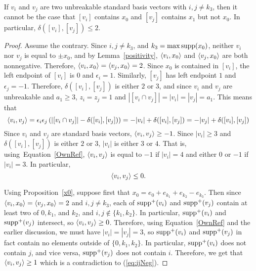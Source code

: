 
\begin{lemma}\label{excludedintervals}
If $v_i$ and $v_j$ are two unbreakable standard basis vectors with $i,j \neq k_3$, then it cannot be the case that $[v_i]$ contains $x_0$ and $[v_j]$ contains $x_1$ but not $x_0$. In particular, $\delta([v_i],[v_j]) \le 2$.
\end{lemma}
\begin{proof}
Assume the contrary. Since $i,j \neq k_3$, and $k_3 = \max \operatorname{supp}(x_0)$, neither $v_i$ nor $v_j$ is equal to $\pm x_0$, and by Lemma~\ref{positivity}, $\left\langle v_i , x_0 \right\rangle$ and $\left\langle v_j , x_0 \right\rangle$ are both nonnegative. Therefore, $\left\langle v_i , x_0 \right\rangle = \left\langle v_j , x_0 \right\rangle = 2$. Since $x_0$ is contained in $[v_i]$, the left endpoint of $[v_i]$ is $0$ and $\epsilon_i = 1$. Similarly, $[v_j]$ has left endpoint $1$ and $\epsilon_j = -1$. Therefore, $\delta([v_i], [v_j])$ is either $2$ or $3$, and since $v_i$ and $v_j$ are unbreakable and $a_1\ge3$, $z_i=z_j=1$ and $|[v_i \cap v_j]| = |v_i| = |v_j|=a_1$. This means that
\begin{equation}\label{OwnRef}
\left\langle v_i , v_j \right\rangle = \epsilon_i \epsilon_j \left(|[v_i \cap v_j]| - \delta([v_i],[v_j])\right) = -|v_i| + \delta([v_i],[v_j]) = -|v_j| + \delta([v_i],[v_j])
\end{equation}
Since $v_i$ and $v_j$ are standard basis vectors, $\left\langle v_i , v_j \right\rangle \ge -1$. Since $|v_i| \ge 3$ and $\delta([v_i],[v_j])$ is either $2$ or $3$, $|v_i|$ is either $3$ or $4$. That is, using~Equation~\eqref{OwnRef}, $\left\langle v_i , v_j \right\rangle$ is equal to $-1$ if $|v_i| = 4$ and either $0$ or $-1$ if $|v_i| = 3$. In particular, 
\begin{equation}\label{eq:ijNeg}
\left\langle v_i , v_j \right\rangle\le 0.
\end{equation}

Using Proposition~\ref{x0}, suppose first that $x_0 = e_0 + e_{k_1} + e_{k_2} - e_{k_3}$. Then since $\left\langle v_i , x_0 \right\rangle = \left\langle v_j , x_0 \right\rangle = 2$ and $i,j \neq k_3$, each of $\operatorname{supp}^+(v_i)$ and $\operatorname{supp}^+(v_j)$ contain at least two of $0, k_1$, and $k_2$, and $i,j\notin\{k_1,k_2\}$. In particular, $\operatorname{supp}^+(v_i)$ and $\operatorname{supp}^+(v_j)$ intersect, so $\left\langle v_i , v_j \right\rangle \ge 0$. Therefore, using Equation~\eqref{OwnRef} and the earlier discussion, we must have $|v_i| = |v_j| = 3$, so $\operatorname{supp}^+(v_i)$ and $\operatorname{supp}^+(v_j)$ in fact contain no elements outside of $\{0,k_1,k_2\}$. In particular, $\operatorname{supp}^+(v_i)$ does not contain $j$, and vice versa, $\operatorname{supp}^+(v_j)$ does not contain $i$. Therefore, we get that $\left\langle v_i , v_j \right\rangle \ge 1$ which is a contradiction to (\ref{eq:ijNeg}). 


\end{proof}

